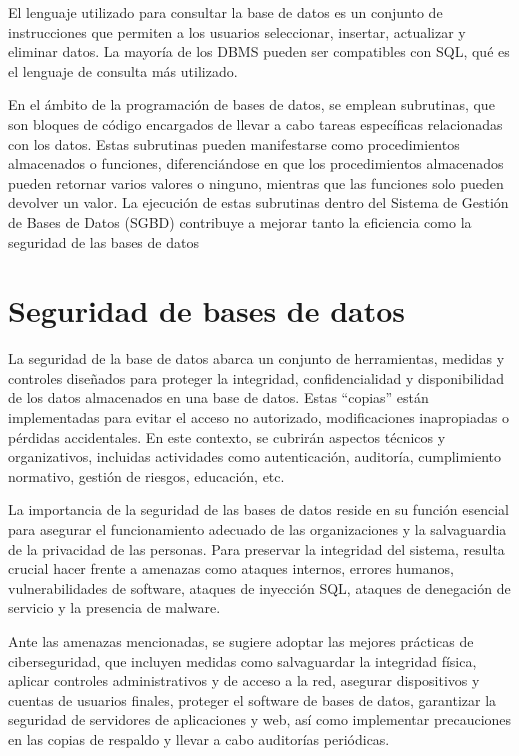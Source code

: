 \documentclass[11pt]{report}
\begin{document}
El lenguaje utilizado para consultar la base de datos es un conjunto de instrucciones que
permiten a los usuarios seleccionar, insertar, actualizar y eliminar datos. La mayoría de los
DBMS pueden ser compatibles con SQL, qué es el lenguaje de consulta más utilizado.

En el ámbito de la programación de bases de datos, se emplean subrutinas, que son
bloques de código encargados de llevar a cabo tareas específicas relacionadas con los
datos. Estas subrutinas pueden manifestarse como procedimientos almacenados o
funciones, diferenciándose en que los procedimientos almacenados pueden retornar varios
valores o ninguno, mientras que las funciones solo pueden devolver un valor. La ejecución
de estas subrutinas dentro del Sistema de Gestión de Bases de Datos (SGBD) contribuye a
mejorar tanto la eficiencia como la seguridad de las bases de datos

\section{Seguridad de bases de datos}
La seguridad de la base de datos abarca un conjunto de herramientas, medidas y controles
diseñados para proteger la integridad, confidencialidad y disponibilidad de los datos
almacenados en una base de datos. Estas “copias” están implementadas para evitar el
acceso no autorizado, modificaciones inapropiadas o pérdidas accidentales. En este
contexto, se cubrirán aspectos técnicos y organizativos, incluidas actividades como
autenticación, auditoría, cumplimiento normativo, gestión de riesgos, educación, etc.

La importancia de la seguridad de las bases de datos reside en su función esencial para
asegurar el funcionamiento adecuado de las organizaciones y la salvaguardia de la
privacidad de las personas. Para preservar la integridad del sistema, resulta crucial hacer
frente a amenazas como ataques internos, errores humanos, vulnerabilidades de software,
ataques de inyección SQL, ataques de denegación de servicio y la presencia de malware.

Ante las amenazas mencionadas, se sugiere adoptar las mejores prácticas de
ciberseguridad, que incluyen medidas como salvaguardar la integridad física, aplicar
controles administrativos y de acceso a la red, asegurar dispositivos y cuentas de usuarios
finales, proteger el software de bases de datos, garantizar la seguridad de servidores de
aplicaciones y web, así como implementar precauciones en las copias de respaldo y llevar a
cabo auditorías periódicas.
\end{document}
